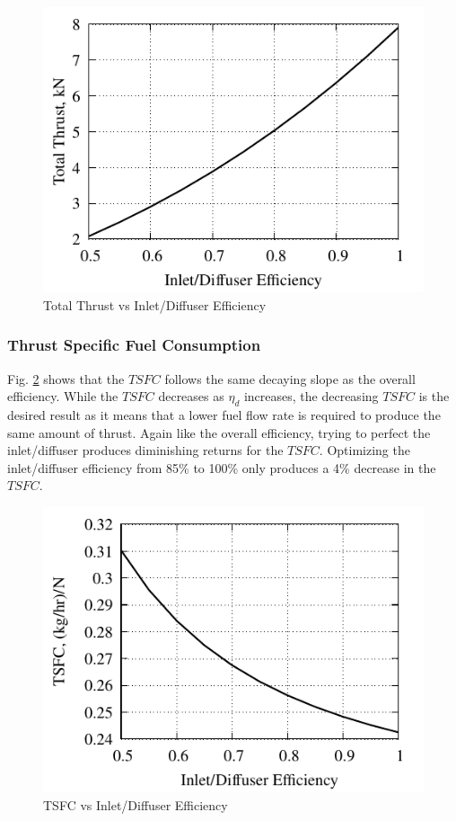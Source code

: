 \documentclass[conf]{new-aiaa} %
\begin{document}
\begin{figure}[H] %
    \centering
    \includegraphics[]{media/performance_parameter_files/part_f_T.pdf}
    \caption{\label{fig:partft}Total Thrust vs Inlet/Diffuser Efficiency}
\end{figure}

\subsubsection{Thrust Specific Fuel Consumption}
Fig. \ref{fig:partftsfc} shows that the $TSFC$ follows the same decaying slope as the overall efficiency. While the $TSFC$ decreases as $\eta_d$ increases, the decreasing $TSFC$ is the desired result as it means that a lower fuel flow rate is required to produce the same amount of thrust. Again like the overall efficiency, trying to perfect the inlet/diffuser produces diminishing returns for the $TSFC$. Optimizing the inlet/diffuser efficiency from 85\% to 100\% only produces a 4\% decrease in the $TSFC$.

\begin{figure}[H] %
    \centering
    \includegraphics[]{media/performance_parameter_files/part_f_TSFC.pdf}
    \caption{\label{fig:partftsfc}TSFC vs Inlet/Diffuser Efficiency}
\end{figure}
\end{document}
